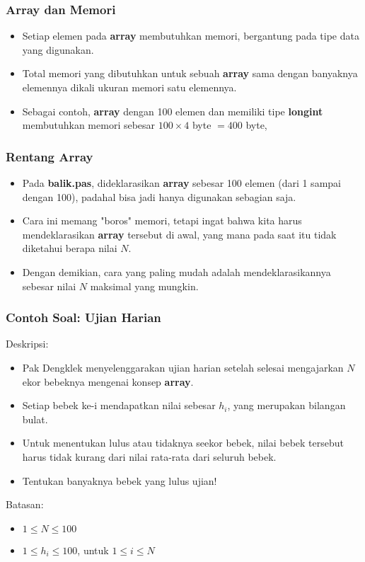 \begin{frame}
\frametitle{Array dan Memori}
\begin{itemize}
  \item Setiap elemen pada \textbf{array} membutuhkan memori, bergantung pada tipe data yang digunakan.
  \item Total memori yang dibutuhkan untuk sebuah \textbf{array} sama dengan banyaknya elemennya dikali ukuran memori satu elemennya.
  \item Sebagai contoh, \textbf{array} dengan 100 elemen dan memiliki tipe \textbf{longint} membutuhkan memori sebesar $100 \times 4$ byte $= 400$ byte,
\end{itemize}
\end{frame}

\begin{frame}
\frametitle{Rentang Array}
\begin{itemize}
  \item Pada \textbf{balik.pas}, dideklarasikan \textbf{array} sebesar 100 elemen (dari 1 sampai dengan 100), padahal bisa jadi hanya digunakan sebagian saja.
  \item Cara ini memang "boros" memori, tetapi ingat bahwa kita harus mendeklarasikan \textbf{array} tersebut di awal, yang mana pada saat itu tidak diketahui berapa nilai $N$.
  \item Dengan demikian, cara yang paling mudah adalah mendeklarasikannya sebesar nilai $N$ maksimal yang mungkin.
\end{itemize}
\end{frame}

\begin{frame}
\frametitle{Contoh Soal: Ujian Harian}
Deskripsi:
\begin{itemize}
  \item Pak Dengklek menyelenggarakan ujian harian setelah selesai mengajarkan $N$ ekor bebeknya mengenai konsep \textbf{array}.
  \item Setiap bebek ke-i mendapatkan nilai sebesar \textbf{$h_i$}, yang merupakan bilangan bulat.
  \item Untuk menentukan lulus atau tidaknya seekor bebek, nilai bebek tersebut harus tidak kurang dari nilai rata-rata dari seluruh bebek.
  \item Tentukan banyaknya bebek yang lulus ujian!
\end{itemize}
Batasan:
\begin{itemize}
  \item $1 \le N \le 100$
  \item $1 \le h_i \le 100$, untuk $1 \le i \le N$
\end{itemize}
\end{frame}

